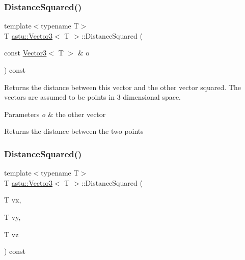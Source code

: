 \subsubsection{\texorpdfstring{Distance\+Squared()}{DistanceSquared()}\hspace{0.1cm}{\footnotesize\ttfamily [1/2]}}
{\footnotesize\ttfamily template$<$typename T$>$ \\
T \hyperlink{classastu_1_1Vector3}{astu\+::\+Vector3}$<$ T $>$\+::Distance\+Squared (\begin{DoxyParamCaption}\item[{const \hyperlink{classastu_1_1Vector3}{Vector3}$<$ T $>$ \&}]{o }\end{DoxyParamCaption}) const\hspace{0.3cm}{\ttfamily [inline]}}

Returns the distance between this vector and the other vector squared. The vectors are assumed to be points in 3 dimensional space.


\begin{DoxyParams}{Parameters}
{\em o} & the other vector \\
\hline
\end{DoxyParams}
\begin{DoxyReturn}{Returns}
the distance between the two points 
\end{DoxyReturn}
\mbox{\label{classastu_1_1Vector3_acd7c764b598e05bf18b267f3d42253e4}} 
\subsubsection{\texorpdfstring{Distance\+Squared()}{DistanceSquared()}\hspace{0.1cm}{\footnotesize\ttfamily [2/2]}}
{\footnotesize\ttfamily template$<$typename T$>$ \\
T \hyperlink{classastu_1_1Vector3}{astu\+::\+Vector3}$<$ T $>$\+::Distance\+Squared (\begin{DoxyParamCaption}\item[{T}]{vx,  }\item[{T}]{vy,  }\item[{T}]{vz }\end{DoxyParamCaption}) const\hspace{0.3cm}{\ttfamily [inline]}}

